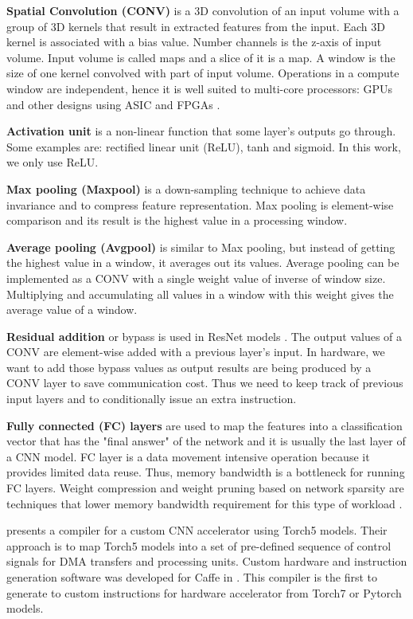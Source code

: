 \documentclass{sig-alternate}
\begin{document}
\textbf{Spatial Convolution (CONV)} is a $3$D convolution of an input volume with a group of $3$D kernels that result in extracted features from the input. Each $3$D kernel is associated with a bias value. Number channels is the z-axis of input volume. Input volume is called maps and a slice of it is a map. A window is the size of one kernel convolved with part of input volume. Operations in a compute window are independent, hence it is well suited to multi-core processors: GPUs \cite{gpucnn} and other designs using ASIC \cite{chen_eyeriss_isca,cavigelli_origami} and FPGAs \cite{nnx,zhang_cnnfpga}.

\textbf{Activation unit} is a non-linear function that some layer's outputs go through. Some examples are: rectified linear unit (ReLU), tanh and sigmoid. In this work, we only use ReLU. 

\textbf{Max pooling (Maxpool)} is a down-sampling technique to achieve data invariance and to compress feature representation. Max pooling is element-wise comparison and its result is the highest value in a processing window. 

\textbf{Average pooling (Avgpool)} is similar to Max pooling, but instead of getting the highest value in a window, it averages out its values. Average pooling can be implemented as a CONV with a single weight value of inverse of window size. Multiplying and accumulating all values in a window with this weight gives the average value of a window.

\textbf{Residual addition} or bypass is used in ResNet models \cite{resnet}. The output values of a CONV are element-wise added with a previous layer's input. In hardware, we want to add those bypass values as output results are being produced by a CONV layer to save communication cost. Thus we need to keep track of previous input layers and to conditionally issue an extra instruction.

\textbf{Fully connected (FC) layers} are used to map the features into a classification vector that has the "final answer" of the network and it is usually the last layer of a CNN model. FC layer is a data movement intensive operation because it provides limited data reuse. Thus, memory bandwidth is a bottleneck for running FC layers. Weight compression and weight pruning based on network sparsity are techniques that lower memory bandwidth requirement for this type of workload \cite{han_eie, iccad_compression}.

\cite{farabet_neuflow} presents a compiler for a custom CNN accelerator using Torch5 models. Their approach is to map Torch5 models into a set of pre-defined sequence of control signals for DMA transfers and processing units. Custom hardware and instruction generation software was developed for Caffe \cite{sw_caffe} in \cite{zhang_caffeine,hw_neurostream}. This compiler is the first to generate to custom instructions for hardware accelerator from Torch7 \cite{sw_torch7} or Pytorch models. 
\end{document}
